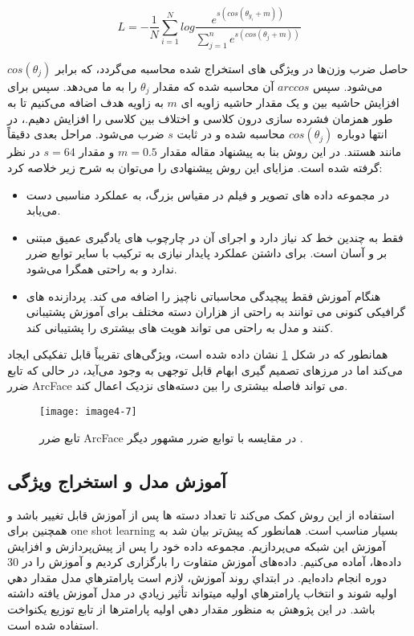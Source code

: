 \begin{equation}
L = - \frac{1}{N} \sum_{i=1}^{N} log \frac{e^{s(cos(\theta_{y_i}+m))}}{\sum_{j=1}^{n} e^{s(cos(\theta_j + m))}}
\label{eq4-9}
\end{equation}

\noindent 
حاصل ضرب وزن‌‌ها در ویژگی های استخراج شده محاسبه می‌گردد، که برابر $cos(\theta_j)$ می‌شود‌‌. سپس $arccos$ آن محاسبه شده که مقدار $\theta_j$ را به ما می‌دهد. سپس برای افزایش حاشیه بین  و  یک مقدار حاشیه زاویه ای $m$ به زاویه هدف اضافه می‌کنیم‌ تا به طور همزمان فشرده سازی درون کلاسی و اختلاف بین کلاسی را افزایش دهیم.، در انتها دوباره $cos(\theta_j)$ محاسبه شده و در ثابت $s$ ضرب می‌شود.  مراحل بعدی دقیقاً مانند  هستند. در این روش بنا به پیشنهاد مقاله \cite{deng2019arcface} مقدار $m=0.5$ و مقدار $s=64$ در نظر گرفته شده است. مزایای این روش پیشنهادی را می‌توان به شرح زیر خلاصه کرد:

\begin{itemize}
 \item
در مجموعه داده های تصویر و فیلم در مقیاس بزرگ‌، به عملکرد مناسبی دست می‌یابد.
 \item
فقط به چندین خط کد نیاز دارد و اجرای آن در چارچوب های یادگیری عمیق مبتنی بر  و  آسان است. برای داشتن عملکرد پایدار نیازی به ترکیب با سایر توابع ضرر ندارد و به راحتی همگرا می‌شود.
 \item
هنگام آموزش فقط پیچیدگی محاسباتی ناچیز را اضافه می کند. پردازنده های گرافیکی کنونی می توانند به راحتی از هزاران دسته مختلف برای آموزش پشتیبانی کنند و مدل به راحتی می تواند هویت های بیشتری را پشتیبانی کند.
\end{itemize} 

همانطور که در شکل \ref{image4-7} نشان داده شده است،  ویژگی‌های تقریباً قابل تفکیکی ایجاد می‌کند اما در مرزهای تصمیم گیری ابهام قابل توجهی به وجود می‌آید، در حالی که تابع ضرر ArcFace می تواند فاصله بیشتری را بین دسته‌های نزدیک اعمال کند.
\begin{figure}[h]
\centering
  \texttt{[image: image4-7]}
  \caption{تابع ضرر ArcFace در مقایسه با توابع ضرر مشهور دیگر \cite{deng2019arcface}.}
  \label{image4-7}
\end{figure}

\subsection{آموزش مدل و استخراج ویژگی}
استفاده از این روش کمک می‌کند تا تعداد دسته ها پس از آموزش قابل تغییر باشد و همچنین برای one shot learning بسیار مناسب است. همانطور که پیش‌تر بیان شد به آموزش این شبکه می‌پردازیم. مجموعه داده خود را پس از پیش‌پردازش و افزایش‌ داده‌ها، آماده می‌کنیم. داده‌های آموزش متفاوت را بارگزاری کردیم و آموزش را در 30 دوره انجام داده‌ایم. در ابتداي روند آموزش، لازم است پارامترهاي مدل مقدار دهي اوليه شوند و انتخاب پارامترهاي اوليه ميتواند تأثير زيادي در مدل آموزش يافته داشته باشد. در اين پژوهش به منظور مقدار دهي اوليه پارامترها از تابع توزيع يكنواخت استفاده شده است. 

